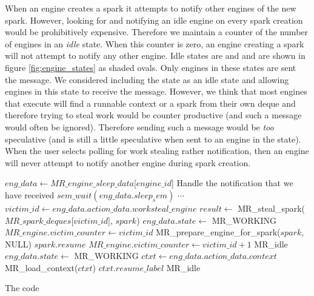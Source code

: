 When an engine creates a spark it attempts to notify other engines of
the new spark.
However, looking for and notifying an idle engine on every spark creation
would be prohibitively expensive.
Therefore we maintain a counter of the number of engines in an \emph{idle}
state.
When this counter is zero, an engine creating a spark will not attempt to
notify any other engine.
Idle states are  and 
and are shown in figure \ref{fig:engine_states} as shaded ovals.
Only engines in these states are sent the  message.
We considered including the  state as an idle
state and allowing engines in this state to receive the
 message.
However, we think that most engines that execute \idle will find a runnable
context or a spark from their own deque and therefore trying to steal work
would be counter productive (and such a message would often be ignored).
Therefore sending such a message would be \emph{too} speculative
(and is still a little speculative when sent to an engine in the
 state).
When the user selects polling for work stealing rather notification,
then an engine will never attempt to notify another engine during spark
creation.

\begin{algorithm}
\begin{algorithmic}[1]
        \State $eng\_data \gets MR\_engine\_sleep\_data$[$engine\_id$]
            \State Handle the notification that we have received
        \EndIf
        \State $sem\_wait(eng\_data.sleep_sem)$
            \State $\cdots$
          \EndCase
            \State $victim\_id \gets
                eng\_data.action\_data.worksteal\_engine$
            \Repeat
                \State $result \gets$
                    MR\_steal\_spark($MR\_spark\_deques$[$victim\_id$],
                        \text{\code{\&}}$spark$)
                \State $eng\_data.state \gets$ MR\_WORKING
                \State $MR\_engine.victim\_counter \gets victim\_id$
                \State MR\_prepare\_engine\_for\_spark($spark$, NULL)
                \Goto $spark.resume$
            \Else {}
                \State $MR\_engine.victim\_counter \gets victim\_id + 1$
                \Goto MR\_idle
            \EndIf
          \EndCase
            \State $eng\_data.state \gets$ MR\_WORKING
            \State $ctxt \gets eng\_data.action\_data.context$
            \State MR\_load\_context($ctxt$)
            \Goto $ctxt.resume\_label$
          \EndCase
            \Goto MR\_idle
          \EndCase
        \EndSwitch
    \EndProcedure
\end{algorithmic}
\caption{The \sleep code}
\label{alg:sleep}
\end{algorithm}

